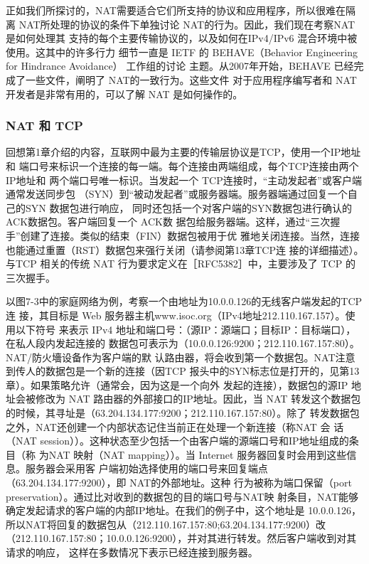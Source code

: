 正如我们所探讨的，NAT需要适合它们所支持的协议和应用程序，所以很难在隔离
NAT所处理的协议的条件下单独讨论 NAT的行为。因此，我们现在考察NAT是如何处理其
支持的每个主要传输协议的，以及如何在IPv4/IPv6 混合环境中被使用。这其中的许多行力
细节一直是 IETF 的 BEHAVE（Behavior Engineering for Hindrance Avoidance） 工作组的讨论
主题。从2007年开始，BEHAVE 已经完成了一些文件，阐明了 NAT的一致行为。这些文件
对于应用程序编写者和 NAT 开发者是非常有用的，可以了解 NAT 是如何操作的。

\subsubsection{NAT 和 TCP}

回想第1章介绍的内容，互联网中最为主要的传输层协议是TCP，使用一个IP地址和
端口号来标识一个连接的每一端。每个连接由两端组成，每个TCP连接由两个IP地址和
两个端口号唯一标识。当发起一个 TCP连接时，“主动发起者”或客户端通常发送同步包
（SYN）到“被动发起者”或服务器端。服务器端通过回复一个自己的SYN 数据包进行响应，
同时还包括一个对客户端的SYN数据包进行确认的ACK数据包。客户端回复一个 ACK数
据包给服务器端。这样，通过“三次握手”创建了连接。类似的结束（FIN）数据包被用于优
雅地关闭连接。当然，连接也能通过重置（RST）数据包来强行关闭（请参阅第13章TCP连
接的详细描述）。与TCP 相关的传统 NAT 行为要求定义在［RFC5382］中，主要涉及了 TCP
的三次握手。

以图7-3中的家庭网络为例，考察一个由地址为10.0.0.126的无线客户端发起的TCP 连
接，其目标是 Web 服务器主机www.isoc.org（IPv4地址212.110.167.157）。使用以下符号
来表示 IPv4 地址和端口号：（源IP：源端口；目标IP：目标端口），在私人段内发起连接的
数据包可表示为（10.0.0.126:9200；212.110.167.157:80）。NAT/防火墻设备作为客户端的默
认路由器，将会收到第一个数据包。NAT注意到传人的数据包是一个新的连接（因TCP
报头中的SYN标志位是打开的，见第13章）。如果策略允许（通常会，因为这是一个向外
发起的连接），数据包的源IP 地址会被修改为 NAT 路由器的外部接口的IP地址。因此，当
NAT 转发这个数据包的时候，其寻址是（63.204.134.177:9200；212.110.167.157:80）。除了
转发数据包之外，NAT还创建一个内部状态记住当前正在处理一个新连接（称NAT 会
话（NAT session））。这种状态至少包括一个由客户端的源端口号和IP地址组成的条目（称
为NAT 映射（NAT mapping））。当 Internet 服务器回复时会用到这些信息。服务器会采用客
户端初始选择使用的端口号来回复端点（63.204.134.177:9200），即 NAT的外部地址。这种
行为被称为端口保留（port preservation）。通过比对收到的数据包的目的端口号与NAT映
射条目，NAT能够确定发起请求的客户端的内部IP地址。在我们的例子中，这个地址是
10.0.0.126，所以NAT将回复的数据包从（212.110.167.157:80;63.204.134.177:9200）改
（212.110.167.157:80；10.0.0.126:9200），并对其进行转发。然后客户端收到对其请求的响应，
这样在多数情况下表示已经连接到服务器。


